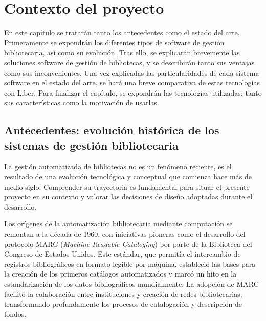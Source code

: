 \chapter{Contexto del proyecto}
En este capítulo se tratarán tanto los antecedentes como el estado del arte. Primeramente se expondrán los diferentes tipos de software de gestión bibliotecaria, así como su evolución. Tras ello, se explicarán brevemente las soluciones software de gestión de bibliotecas, y se describirán tanto sus ventajas como sus inconvenientes. Una vez explicadas las particularidades de cada sistema software en el estado del arte, se hará una breve comparativa de estas tecnologías con Liber. Para finalizar el capítulo, se expondrán las tecnologías utilizadas; tanto sus características como la motivación de usarlas.

\section{Antecedentes: evolución histórica de los sistemas de gestión bibliotecaria}

La gestión automatizada de bibliotecas no es un fenómeno reciente, es el resultado de una evolución tecnológica y conceptual que comienza hace más de medio siglo. Comprender su trayectoria es fundamental para situar el presente proyecto en su contexto y valorar las decisiones de diseño adoptadas durante el desarrollo.

Los orígenes de la automatización bibliotecaria mediante computación se remontan a la década de 1960, con iniciativas pioneras como el desarrollo del protocolo MARC (\textit{Machine-Readable Cataloging}) por parte de la Biblioteca del Congreso de Estados Unidos. Este estándar, que permitía el intercambio de registros bibliográficos en formato legible por máquina, estableció las bases para la creación de los primeros catálogos automatizados y marcó un hito en la estandarización de los datos bibliográficos mundialmente. La adopción de MARC facilitó la colaboración entre instituciones y creación de redes bibliotecarias, transformando profundamente los procesos de catalogación y descripción de fondos.

